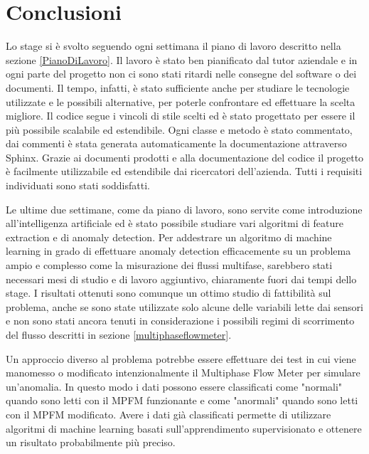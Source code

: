 \chapter{Conclusioni}
\label{conclusion}

Lo stage si è svolto seguendo ogni settimana il piano di lavoro descritto nella sezione \ref{PianoDiLavoro}. Il lavoro è stato ben pianificato dal tutor aziendale e in ogni parte del progetto non ci sono stati ritardi nelle consegne del software o dei documenti. Il tempo, infatti, è stato sufficiente anche per studiare le tecnologie utilizzate e le possibili alternative, per poterle confrontare ed effettuare la scelta migliore. Il codice segue i vincoli di stile scelti ed è stato progettato per essere il più possibile scalabile ed estendibile. Ogni classe e metodo è stato commentato, dai commenti è stata generata automaticamente la documentazione attraverso Sphinx. Grazie ai documenti prodotti e alla documentazione del codice il progetto è facilmente utilizzabile ed estendibile dai ricercatori dell'azienda. Tutti i requisiti individuati sono stati soddisfatti.

Le ultime due settimane, come da piano di lavoro, sono servite come introduzione all'intelligenza artificiale ed è stato possibile studiare vari algoritmi di feature extraction e di anomaly detection. Per addestrare un algoritmo di machine learning in grado di effettuare anomaly detection efficacemente su un problema ampio e complesso come la misurazione dei flussi multifase\cite{multiphaseIntroduction}, sarebbero stati necessari mesi di studio e di lavoro aggiuntivo, chiaramente fuori dai tempi dello stage. I risultati ottenuti sono comunque un ottimo studio di fattibilità sul problema, anche se sono state utilizzate solo alcune delle variabili lette dai sensori e non sono stati ancora tenuti in considerazione i possibili regimi di scorrimento del flusso descritti in sezione \ref{multiphaseflowmeter}. 

Un approccio diverso al problema potrebbe essere effettuare dei test in cui viene manomesso o modificato intenzionalmente il Multiphase Flow Meter per simulare un'anomalia. In questo modo i dati possono essere classificati come "normali" quando sono letti con il MPFM funzionante e come "anormali" quando sono letti con il MPFM modificato. Avere i dati già classificati permette di utilizzare algoritmi di machine learning basati sull'apprendimento supervisionato e ottenere un risultato probabilmente più preciso.
